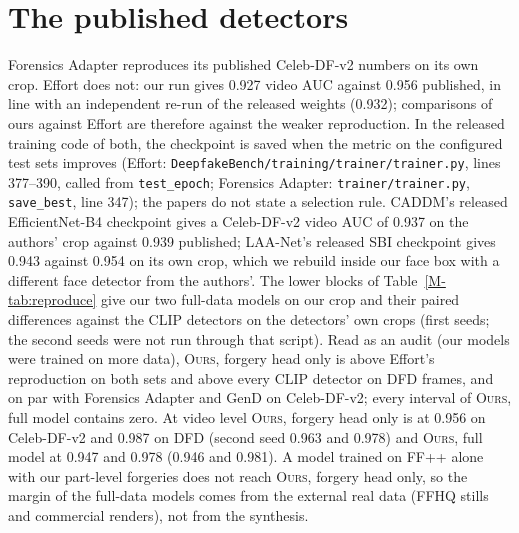 \documentclass[10pt]{article}
\newcommand{\oursB}{\textsc{Ours}, forgery head only}
\newcommand{\oursF}{\textsc{Ours}, full model}
\begin{document}
\section{The published detectors}
\label{sec:baselines}
\begin{table}[H]
\centering
\caption{Weights, training data and input of each published detector. On the video sources the twelve detectors trained on
DeepfakeBench crops (the eight CNNs and the four CLIP detectors) are also scored on their own crop (dlib, five-point alignment, scale 1.3); SBI,
UnivFD and NPR run on our crop; CADDM and LAA-Net re-align our crop with their own landmark or face models. On the retouching
service and on DF40 every detector receives the same crop. UnivFD and NPR are general generated-image detectors, so the
measurement covers fifteen face-forgery detectors and two general ones.}
\label{tab:baselines}
\footnotesize

\end{table}
\begin{table}[H]\centering\caption{The reproduced numbers are Table~\ref{M-tab:reproduce} of the paper.}\label{tab:reproduce}\end{table}
Forensics Adapter reproduces its published Celeb-DF-v2 numbers on its own crop. Effort does not: our run gives 0.927 video AUC
against 0.956 published, in line with an independent re-run of the released weights (0.932); comparisons of ours against
Effort are therefore against the weaker reproduction. In the released training code of both, the checkpoint is saved when the
metric on the configured test sets improves (Effort: \texttt{DeepfakeBench/training/trainer/trainer.py}, lines 377--390, called
from \texttt{test\_epoch}; Forensics Adapter: \texttt{trainer/trainer.py}, \texttt{save\_best}, line 347); the papers do not state a
selection rule. CADDM's released EfficientNet-B4 checkpoint gives a Celeb-DF-v2 video AUC of 0.937 on the authors' crop against
0.939 published; LAA-Net's released SBI checkpoint gives 0.943 against 0.954 on its own crop, which we rebuild inside our face
box with a different face detector from the authors'. The lower blocks of Table~\ref{M-tab:reproduce} give our two full-data
models on our crop and their paired differences against the CLIP detectors on the detectors' own crops (first seeds; the second
seeds were not run through that script). Read as an audit (our models were trained on more data), \oursB{} is above Effort's reproduction on both sets and above
every CLIP detector on DFD frames, and on
par with Forensics Adapter and GenD on Celeb-DF-v2; every interval of \oursF{} contains zero. At video
level \oursB{} is at 0.956 on Celeb-DF-v2 and 0.987 on DFD (second seed 0.963 and 0.978) and \oursF{} at 0.947 and 0.978 (0.946
and 0.981). A model trained on FF++ alone with our part-level forgeries does not reach \oursB{}, so the margin of the full-data
models comes from the external real data (FFHQ stills and commercial renders), not from the synthesis.
\end{document}
